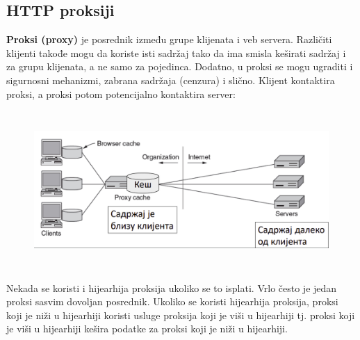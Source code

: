 \documentclass[a4paper]{article}
\begin{document}
    \subsection{HTTP proksiji}
        \textbf{Proksi (proxy)} je posrednik između grupe klijenata i veb servera. Različiti klijenti
        takođe mogu da koriste isti sadržaj tako da ima smisla keširati sadržaj i za grupu klijenata,
        a ne samo za pojedinca. Dodatno, u proksi se mogu ugraditi i sigurnosni mehanizmi,
        zabrana sadržaja (cenzura) i slično. Klijent kontaktira proksi, a proksi potom
        potencijalno kontaktira server:
        \begin{figure}[H]
            \begin{center}
                \includegraphics[width=120mm,height=60mm]{Slike/http9.png}
            \end{center}
        \end{figure}

        Nekada se koristi i hijearhija proksija ukoliko se to isplati. Vrlo često je jedan
        proksi sasvim dovoljan posrednik. Ukoliko se koristi hijearhija proksija,
        proksi koji je niži u hijearhiji koristi usluge proksija koji je viši u hijearhiji
        tj. proksi koji je viši u hijearhiji kešira podatke za proksi koji je niži u
        hijearhiji.
\end{document}
